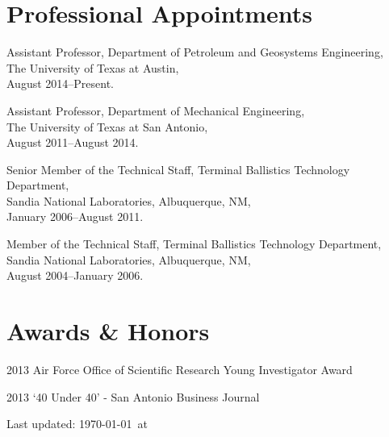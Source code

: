 \documentclass[12pt,letterpaper]{article}
\def\HCode#1{}
\renewenvironment{itemize}{
  \begin{list}{}{
    \setlength{\leftmargin}{1.5em}
    \setlength{\itemsep}{0.25em}
    \setlength{\parskip}{0pt}
    \setlength{\parsep}{0.25em}
  }
}{
  \end{list}
}
\begin{document}
\section*{Professional Appointments}

\begin{itemize}
    \item Assistant Professor, Department of Petroleum and Geosystems Engineering, \\ 
          The University of Texas at Austin, \\
          August 2014--Present. 

    \item Assistant Professor, Department of Mechanical Engineering, \\ 
          The University of Texas at San Antonio,\\
          August 2011--August 2014. 

    \item Senior Member of the Technical Staff, Terminal Ballistics Technology Department, \\ 
          Sandia National Laboratories, Albuquerque, NM, \\ 
          January 2006--August 2011.

    \item Member of the Technical Staff, Terminal Ballistics Technology Department, \\ 
          Sandia National Laboratories, Albuquerque, NM, \\ 
          August 2004--January 2006.
\end{itemize}

\section*{Awards \& Honors}

\begin{itemize}
    \item 2013 Air Force Office of Scientific Research Young Investigator Award

    \item 2013 `40 Under 40' - San Antonio Business Journal
\end{itemize}









%

%

\vfill 
\HCode{<center>}
\begin{center}
    \begin{small}
        Last updated: \today\ at \currenttime
    \end{small}
\end{center}
\HCode{</center>}



\HCode{</div>} %
\HCode{</div>} %
\HCode{</div>} %
\end{document}
